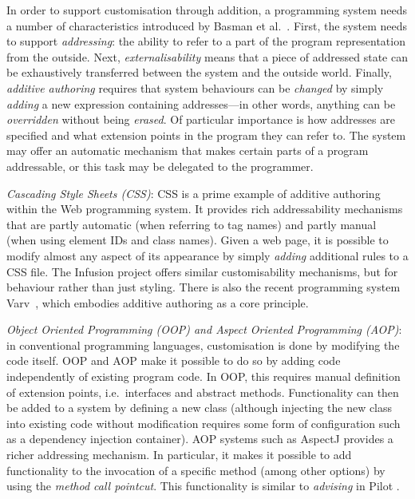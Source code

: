 \documentclass[ twoside,openright,titlepage,numbers=noenddot,headinclude,footinclude,cleardoublepage=empty,abstract=on,
                BCOR=5mm,paper=a4,fontsize=11pt
                ]{scrreprt}
\theoremstyle{definition}
\begin{document}
In order to support customisation through addition, a programming system
needs a number of characteristics introduced by Basman et
al.~\parencite{Externalize,OpenAuthorial}. First, the system needs to
support \emph{addressing}: the ability to refer to a part of the program
representation from the outside. Next, \emph{externalisability} means
that a piece of addressed state can be exhaustively transferred between
the system and the outside world. Finally, \emph{additive authoring}
requires that system behaviours can be \emph{changed} by simply
\emph{adding} a new expression containing addresses---in other words,
anything can be \emph{overridden} without being \emph{erased}. Of
particular importance is how addresses are specified and what extension
points in the program they can refer to. The system may offer an
automatic mechanism that makes certain parts of a program addressable,
or this task may be delegated to the programmer.

\emph{Cascading Style Sheets (CSS)}: CSS is a prime example of additive
authoring within the Web programming system. It provides rich
addressability mechanisms that are partly automatic (when referring to
tag names) and partly manual (when using element IDs and class names).
Given a web page, it is possible to modify almost any aspect of its
appearance by simply \emph{adding} additional rules to a CSS file. The
Infusion project \parencite{Infusion} offers similar customisability
mechanisms, but for behaviour rather than just styling. There is also
the recent programming system Varv~\parencite{Varv}, which embodies
additive authoring as a core principle.

\emph{Object Oriented Programming (OOP) and Aspect Oriented Programming
(AOP)}: in conventional programming languages, customisation is done by
modifying the code itself. OOP and AOP make it possible to do so by
adding code independently of existing program code. In OOP, this
requires manual definition of extension points, i.e.~interfaces and
abstract methods. Functionality can then be added to a system by
defining a new class (although injecting the new class into existing
code without modification requires some form of configuration such as a
dependency injection container). AOP systems such as AspectJ
\parencite{AspectJ} provides a richer addressing mechanism. In
particular, it makes it possible to add functionality to the invocation
of a specific method (among other options) by using the \emph{method
call pointcut}. This functionality is similar to \emph{advising} in
Pilot \parencite{Pilot}.
\end{document}
